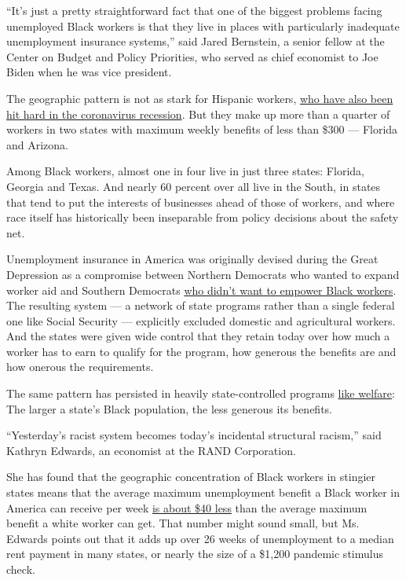 ``It's just a pretty straightforward fact that one of the biggest
problems facing unemployed Black workers is that they live in places
with particularly inadequate unemployment insurance systems,'' said
Jared Bernstein, a senior fellow at the Center on Budget and Policy
Priorities, who served as chief economist to Joe Biden when he was vice
president.

The geographic pattern is not as stark for Hispanic workers,
\href{https://www.pewresearch.org/hispanic/2020/08/04/coronavirus-economic-downturn-has-hit-latinos-especially-hard/}{who
have also been hit hard in the coronavirus recession}. But they make up
more than a quarter of workers in two states with maximum weekly
benefits of less than \$300 --- Florida and Arizona.

Among Black workers, almost one in four live in just three states:
Florida, Georgia and Texas. And nearly 60 percent over all live in the
South, in states that tend to put the interests of businesses ahead of
those of workers, and where race itself has historically been
inseparable from policy decisions about the safety net.

Unemployment insurance in America was originally devised during the
Great Depression as a compromise between Northern Democrats who wanted
to expand worker aid and Southern Democrats
\href{https://www.nytimes3xbfgragh.onion/2005/08/28/books/review/when-affirmative-action-was-white-uncivil-rights.html}{who
didn't want to empower Black workers}. The resulting system --- a
network of state programs rather than a single federal one like Social
Security --- explicitly excluded domestic and agricultural workers. And
the states were given wide control that they retain today over how much
a worker has to earn to qualify for the program, how generous the
benefits are and how onerous the requirements.

The same pattern has persisted in heavily state-controlled programs
\href{https://www.urban.org/research/publication/why-does-cash-welfare-depend-where-you-live}{like
welfare}: The larger a state's Black population, the less generous its
benefits.

``Yesterday's racist system becomes today's incidental structural
racism,'' said Kathryn Edwards, an economist at the RAND Corporation.

She has found that the geographic concentration of Black workers in
stingier states means that the average maximum unemployment benefit a
Black worker in America can receive per week
\href{https://www.rand.org/blog/2020/07/the-racial-disparity-in-unemployment-benefits.html}{is
about \$40 less} than the average maximum benefit a white worker can
get. That number might sound small, but Ms. Edwards points out that it
adds up over 26 weeks of unemployment to a median rent payment in many
states, or nearly the size of a \$1,200 pandemic stimulus check.

